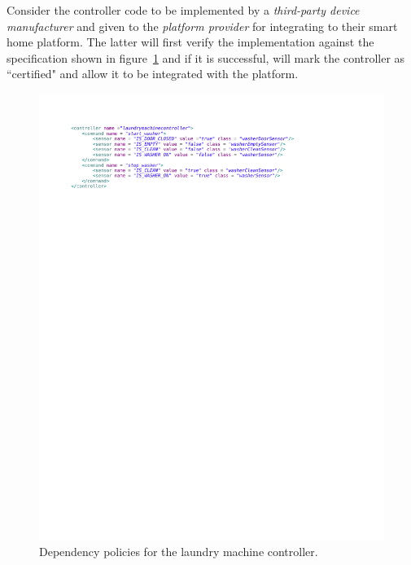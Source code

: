 \documentclass{article}
\begin{document}
Consider the controller code to be implemented by a \textit{third-party device manufacturer} and given to the \textit{platform provider} for integrating to their smart home platform. The latter will first verify the implementation against the specification shown in figure~\ref{fig:policy} and if it is successful, will mark the controller as ``certified" and allow it to be integrated with the platform.\\

\begin{figure}[h]
\begin{center}
\includegraphics[scale=0.7, trim = 0 21.5cm 0 2cm]{policy.pdf}
\caption{Dependency policies for the laundry machine controller.}
\label{fig:policy}
\end{center}
\end{figure}
\end{document}
